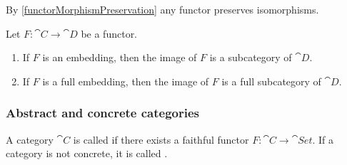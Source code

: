 By \ref{functorMorphismPreservation} any functor preserves isomorphisms.

\begin{proposition}
Let $F:\cat{C}\to\cat{D}$ be a functor.
\begin{enumerate}
\item If $F$ is an embedding, then the image of $F$ is a subcategory of $\cat{D}$.
\item If $F$ is a full embedding, then the image of $F$ is a full subcategory of $\cat{D}$.
\end{enumerate}
\end{proposition}

\subsubsection{Abstract and concrete categories}
\begin{definition}
A category $\cat{C}$ is called  if there exists a faithful functor $F: \cat{C} \to \cat{Set}$.
If a category is not concrete, it is called .
\end{definition}

